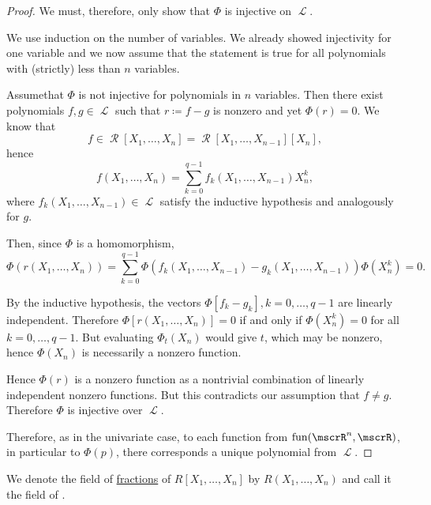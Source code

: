 \begin{proof}
  We must, therefore, only show that \( \Phi \) is injective on \( \mscrL \).

  We use induction on the number of variables. We already showed injectivity for one variable and we now assume that the statement is true for all polynomials with (strictly) less than \( n \) variables.

  Assume\LEM that \( \Phi \) is not injective for polynomials in \( n \) variables. Then there exist polynomials \( f, g \in \mscrL \) such that \( r \coloneqq f - g \) is nonzero and yet \( \Phi(r) = 0 \). We know that
  \begin{equation*}
    f \in \mscrR[X_1, \ldots, X_n] = \mscrR[X_1, \ldots, X_{n-1}][X_n],
  \end{equation*}
  hence
  \begin{equation*}
    f(X_1, \ldots, X_n) = \sum_{k=0}^{q-1} f_k(X_1, \ldots, X_{n-1}) X_n^k,
  \end{equation*}
  where \( f_k(X_1, \ldots, X_{n-1}) \in \mscrL \) satisfy the inductive hypothesis and analogously for \( g \).

  Then, since \( \Phi \) is a homomorphism,
  \begin{equation*}
    \Phi(r(X_1, \ldots, X_n)) = \sum_{k=0}^{q-1} \Phi(f_k(X_1, \ldots, X_{n-1}) - g_k(X_1, \ldots, X_{n-1})) \Phi(X_n^k) = 0.
  \end{equation*}

  By the inductive hypothesis, the vectors \( \Phi[f_k - g_k], k = 0, \ldots, q - 1 \) are linearly independent. Therefore \( \Phi[r(X_1, \ldots, X_n)] = 0 \) if and only if \( \Phi(X_n^k) = 0 \) for all \( k = 0, \ldots, q - 1 \). But evaluating \( \Phi_t(X_n) \) would give \( t \), which may be nonzero, hence \( \Phi(X_n) \) is necessarily a nonzero function.

  Hence \( \Phi(r) \) is a nonzero function as a nontrivial combination of linearly independent nonzero functions. But this contradicts our assumption that \( f \neq g \). Therefore \( \Phi \) is injective over \( \mscrL \).

  Therefore, as in the univariate case, to each function from \( \fun(\mscrR^n, \mscrR) \), in particular to \( \Phi(p) \), there corresponds a unique polynomial from \( \mscrL \).
\end{proof}

\begin{definition}\label{def:rational_algebraic_function}
  We denote the field of \hyperref[def:field_of_fractions]{fractions} of \( R[X_1, \ldots, X_n] \) by \( R(X_1, \ldots, X_n) \) and call it the field of .
\end{definition}

